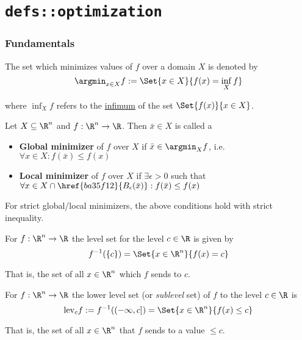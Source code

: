 \chapter{\texttt{defs::optimization}}\label{f79f734}

\begin{toc}
\end{toc}

\subsection{Fundamentals}\label{f7a950f}

\label{b27e478}

The set which minimizes values of $f$ over a domain $X$ is denoted by
$$
  \argmin_{x\in X}f:=\Set{x\in X}{f(x)=\inf_Xf}
$$

where $\inf_Xf$ refers to the \href{ff16df6}{infimum} of the set
$\Set{f(x)}{x\in X}$.

\label{bc7900e}

Let $X\subseteq\R^n$ and $f:\R^n\to\R$. Then $\bar x\in X$ is called a
\begin{itemize}
  \item \textbf{Global minimizer} of $f$ over $X$ if $\bar x\in\argmin_Xf$, i.e.
        $\forall x\in X:f(\bar x)\leq f(x)$
  \item \textbf{Local minimizer} of $f$ over $X$ if $\exists\epsilon>0$ such
        that $\forall x\in X\cap\href{ba35f12}{B_\epsilon(\bar x)}:f(\bar x)\leq f(x)$
\end{itemize}
For strict global/local minimizers, the above conditions hold with
strict inequality.

\label{be6fa5e}

For $f:\R^n\to\R$ the level set for the level $c\in\R$ is given by
$$
  f^{-1}(\{c\})=\Set{x\in\R^n}{f(x)=c}
$$

That is, the set of all $x\in\R^n$ which $f$ sends to $c$.

\label{d6589cc}

For $f:\R^n\to\R$ the lower level set (or \textit{sublevel} set) of $f$ to the
level $c\in\R$ is
$$
  \text{lev}_cf:=f^{-1}((-\infty,c])=\Set{x\in\R^n}{f(x)\leq c}
$$

That is, the set of all $x\in\R^n$ that $f$ sends to a value $\leq c$.
